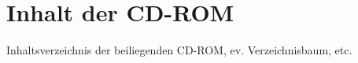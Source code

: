 \chapter{Inhalt der CD-ROM}
\label{chap:Inhalt_CDROM}

Inhaltsverzeichnis der beiliegenden CD-ROM, ev. Verzeichnisbaum, etc.